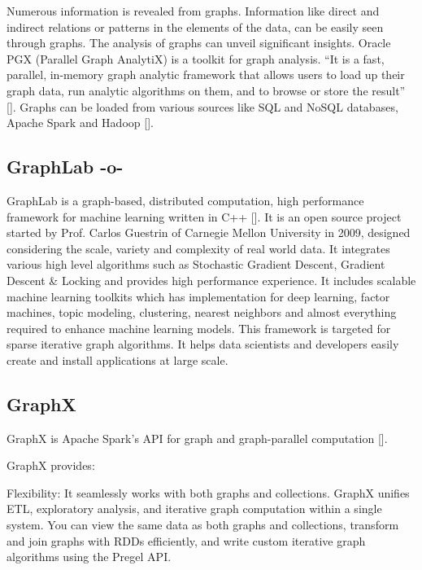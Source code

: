 Numerous information is revealed from graphs. Information like direct
and indirect relations or patterns in the elements of the data, can be
easily seen through graphs. The analysis of graphs can unveil
significant insights. Oracle PGX (Parallel Graph AnalytiX) is a
toolkit for graph analysis.  ``It is a fast, parallel, in-memory graph
analytic framework that allows users to load up their graph data, run
analytic algorithms on them, and to browse or store the
result'' [\cite{www-pgx}]. Graphs can be loaded from various sources
like SQL and NoSQL databases, Apache Spark and Hadoop [\cite{www-ora}].
    
\subsection{GraphLab -o-}

GraphLab is a graph-based, distributed computation, high performance
framework for machine learning written in C++ [\cite{www-graphlab}]. It
is an open source project started by Prof. Carlos Guestrin of Carnegie
Mellon University in 2009, designed considering the scale, variety and
complexity of real world data. It integrates various high level
algorithms such as Stochastic Gradient Descent, Gradient Descent \&
Locking and provides high performance experience. It includes scalable
machine learning toolkits which has implementation for deep learning,
factor machines, topic modeling, clustering, nearest neighbors and
almost everything required to enhance machine learning models. This
framework is targeted for sparse iterative graph algorithms. It helps
data scientists and developers easily create and install applications
at large scale.


    
\subsection{GraphX}

GraphX is Apache Spark's API for graph and graph-parallel
computation [\cite{www-graphX}].
    
GraphX provides:
    
    Flexibility: It seamlessly works with both graphs and
    collections. GraphX unifies ETL, exploratory analysis, and
    iterative graph computation within a single system. You can view
    the same data as both graphs and collections, transform and join
    graphs with RDDs efficiently, and write custom iterative graph
    algorithms using the Pregel API.
    
